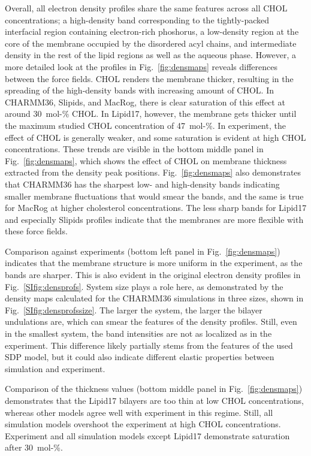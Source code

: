 \documentclass[journal=jctcce]{achemso}
\begin{document}
Overall, all electron density profiles share the same features across all CHOL concentrations; a high-density band corresponding to the tightly-packed interfacial region containing electron-rich phoshorus, a low-density region at the core of the membrane occupied by the disordered acyl chains, and intermediate density in the rest of the lipid regions as well as the aqueous phase. However, a more detailed look at the profiles in Fig.~\ref{fig:densmaps} reveals differences between the force fields. CHOL renders the membrane thicker, resulting in the spreading of the high-density bands with increasing amount of CHOL. In CHARMM36, Slipids, and MacRog, there is clear saturation of this effect at around 30~mol-\% CHOL. In Lipid17, however, the membrane gets thicker until the maximum studied CHOL concentration of 47~mol-\%. In experiment, the effect of CHOL is generally weaker, and some saturation is evident at high CHOL concentrations. These trends are visible in the bottom middle panel in Fig.~\ref{fig:densmaps}, which shows the effect of CHOL on membrane thickness extracted from the density peak positions. Fig.~\ref{fig:densmaps} also demonstrates that CHARMM36 has the sharpest low- and high-density bands indicating smaller membrane fluctuations that would smear the bands, and the same is true for MacRog at higher cholesterol concentrations. The less sharp bands for Lipid17 and especially Slipids profiles indicate that the membranes are more flexible with these force fields.

Comparison against experiments (bottom left panel in Fig.~\ref{fig:densmaps}) indicates that the membrane structure is more uniform in the experiment, as the bands are sharper. This is also evident in the original electron density profiles in Fig.~\ref{SIfig:densprofs}. System size plays a role here, as demonstrated by the density maps calculated for the CHARMM36 simulations in three sizes, shown in Fig.~\ref{SIfig:densprofssize}. The larger the system, the larger the bilayer undulations are, which can smear the features of the density profiles. Still, even in the smallest system, the band intensities are not as localized as in the experiment. This difference likely partially stems from the features of the used SDP model, but it could also indicate different elastic properties between simulation and experiment.

Comparison of the thickness values (bottom middle panel in Fig.~\ref{fig:densmaps}) demonstrates that the Lipid17 bilayers are too thin at low CHOL concentrations, whereas other models agree well with experiment in this regime. Still, all simulation models overshoot the experiment at high CHOL concentrations. Experiment and all simulation models except Lipid17 demonstrate saturation after 30~mol-\%.
\end{document}
